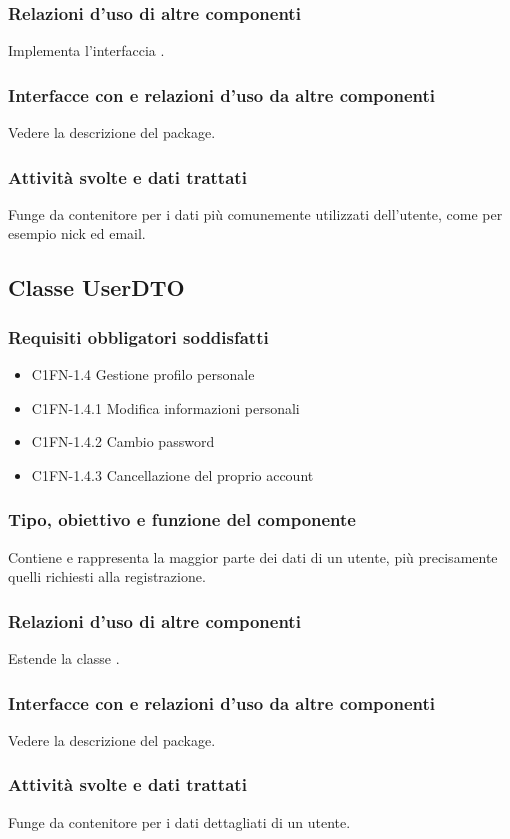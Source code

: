 \subsubsection*{Relazioni d'uso di altre componenti}
Implementa l'interfaccia .
\subsubsection*{Interfacce con e relazioni d'uso da altre componenti}
Vedere la descrizione del package.
\subsubsection*{Attivit\`a svolte e dati trattati}
Funge da contenitore per i dati pi\`u comunemente utilizzati dell'utente, come
per esempio nick ed email.

\subsection{Classe UserDTO}
\subsubsection*{Requisiti obbligatori soddisfatti}
\begin{itemize}
	\item C1FN-1.4 Gestione profilo personale
	\item C1FN-1.4.1 Modifica informazioni personali
	\item C1FN-1.4.2 Cambio password
	\item C1FN-1.4.3 Cancellazione del proprio account
\end{itemize}
\subsubsection*{Tipo, obiettivo e funzione del componente}
Contiene e rappresenta la maggior parte dei dati di un utente, pi\`u
precisamente quelli richiesti alla registrazione.
\subsubsection*{Relazioni d'uso di altre componenti}
Estende la classe .
\subsubsection*{Interfacce con e relazioni d'uso da altre componenti}
Vedere la descrizione del package.
\subsubsection*{Attivit\`a svolte e dati trattati}
Funge da contenitore per i dati dettagliati di un utente.

